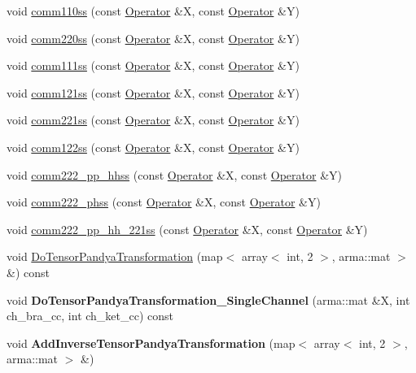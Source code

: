 \begin{DoxyCompactItemize}
\item 
void \hyperlink{classOperator_a39adf2f2f225609606da088b59e3502a}{comm110ss} (const \hyperlink{classOperator}{Operator} \&X, const \hyperlink{classOperator}{Operator} \&Y)
\item 
void \hyperlink{classOperator_a8ea2254b8012c53ff6063a90ab7a5796}{comm220ss} (const \hyperlink{classOperator}{Operator} \&X, const \hyperlink{classOperator}{Operator} \&Y)
\item 
void \hyperlink{classOperator_ae22e28ebda5b170f2cdc4d2d9462971a}{comm111ss} (const \hyperlink{classOperator}{Operator} \&X, const \hyperlink{classOperator}{Operator} \&Y)
\item 
void \hyperlink{classOperator_af80e0152e9dffb0194b8b26c5d75d815}{comm121ss} (const \hyperlink{classOperator}{Operator} \&X, const \hyperlink{classOperator}{Operator} \&Y)
\item 
void \hyperlink{classOperator_abd2096925a9b0028ee988255955b907f}{comm221ss} (const \hyperlink{classOperator}{Operator} \&X, const \hyperlink{classOperator}{Operator} \&Y)
\item 
void \hyperlink{classOperator_a4f4738296848a6d504c331456f361736}{comm122ss} (const \hyperlink{classOperator}{Operator} \&X, const \hyperlink{classOperator}{Operator} \&Y)
\item 
void \hyperlink{classOperator_ae040aa05d6a84031c90ba2259cbb05ae}{comm222\+\_\+pp\+\_\+hhss} (const \hyperlink{classOperator}{Operator} \&X, const \hyperlink{classOperator}{Operator} \&Y)
\item 
void \hyperlink{classOperator_a25b768c4ddceead49af1c7f69d5071ea}{comm222\+\_\+phss} (const \hyperlink{classOperator}{Operator} \&X, const \hyperlink{classOperator}{Operator} \&Y)
\item 
void \hyperlink{classOperator_adf70943fb0ad3c36ea27c1c14dc7f6ec}{comm222\+\_\+pp\+\_\+hh\+\_\+221ss} (const \hyperlink{classOperator}{Operator} \&X, const \hyperlink{classOperator}{Operator} \&Y)
\item 
void \hyperlink{classOperator_a83aa05f43d1881ef41b26783c9eb23f0}{Do\+Tensor\+Pandya\+Transformation} (map$<$ array$<$ int, 2 $>$, arma\+::mat $>$ \&) const 
\item 
void {\bfseries Do\+Tensor\+Pandya\+Transformation\+\_\+\+Single\+Channel} (arma\+::mat \&X, int ch\+\_\+bra\+\_\+cc, int ch\+\_\+ket\+\_\+cc) const \hypertarget{classOperator_ac665c6e896f34819f21844b3ee94218c}{}\label{classOperator_ac665c6e896f34819f21844b3ee94218c}

\item 
void {\bfseries Add\+Inverse\+Tensor\+Pandya\+Transformation} (map$<$ array$<$ int, 2 $>$, arma\+::mat $>$ \&)\hypertarget{classOperator_abbc466d8e8f57deb156d9475b680fd42}{}\label{classOperator_abbc466d8e8f57deb156d9475b680fd42}


\end{DoxyCompactItemize}
